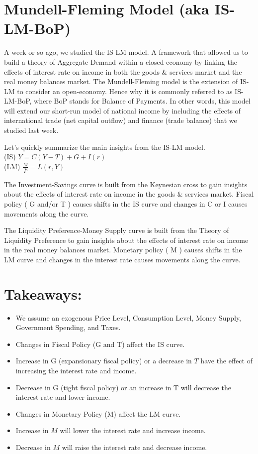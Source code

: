 \documentclass[10pt]{article}
\begin{document}
\section*{Mundell-Fleming Model (aka IS-LM-BoP)}
A week or so ago, we studied the IS-LM model. A framework that allowed us to build a theory of Aggregate Demand within a closed-economy by linking the effects of interest rate on income in both the goods \& services market and the real money balances market. The Mundell-Fleming model is the extension of IS-LM to consider an open-economy. Hence why it is commonly referred to as IS-LM-BoP, where BoP stands for Balance of Payments. In other words, this model will extend our short-run model of national income by including the effects of international trade (net capital outflow) and finance (trade balance) that we studied last week.

Let's quickly summarize the main insights from the IS-LM model.\\
(IS) $Y=C(Y-T)+G+I(r)$\\
(LM) $\frac{\bar{M}}{\bar{P}}=L(r, Y)$

The Investment-Savings curve is built from the Keynesian cross to gain insights about the effects of interest rate on income in the goods \& services market. Fiscal policy ( G and/or T ) causes shifts in the IS curve and changes in C or I causes movements along the curve.

The Liquidity Preference-Money Supply curve is built from the Theory of Liquidity Preference to gain insights about the effects of interest rate on income in the real money balances market. Monetary policy ( M ) causes shifts in the LM curve and changes in the interest rate causes movements along the curve.

\section*{Takeaways:}
\begin{itemize}
  \item We assume an exogenous Price Level, Consumption Level, Money Supply, Government Spending, and Taxes.
  \item Changes in Fiscal Policy (G and T) affect the IS curve.
  \item Increase in G (expansionary fiscal policy) or a decrease in $T$ have the effect of increasing the interest rate and income.
  \item Decrease in G (tight fiscal policy) or an increase in T will decrease the interest rate and lower income.
  \item Changes in Monetary Policy (M) affect the LM curve.
  \item Increase in $M$ will lower the interest rate and increase income.
  \item Decrease in $M$ will raise the interest rate and decrease income.
\end{itemize}
\end{document}
